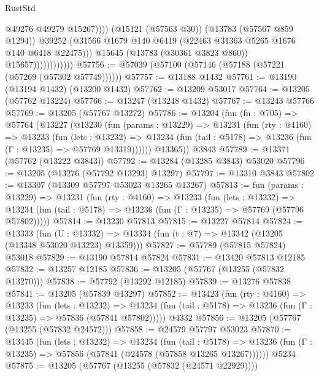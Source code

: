 \begin{lexlean}{RustStd}
\begin{coremodule}
                                      @49276
                                      @49279
                                      @15267))))
                              (@15121 (@57563 @30))
                              (@13783 (@57567 @859 @1294))
                              @39252
                              (@31566
                                @1679
                                @140
                                @6419
                                (@22463 @31363 @5265 @1676 @140 @6418 @22475)))
                            @15645
                            (@13783 (@30361 @3823 @860))
                            @15657))))))))))))
@57756 := @57039 (@57100 (@57146 (@57188 (@57221 (@57269 (@57302 @57749))))))
@57757 := @13188 @1432
@57761 := @13190 (@13194 @1432) (@13200 @1432)
@57762 := @13209 @53017
@57764 := @13205 (@57762 @13224)
@57766 := @13247 (@13248 @1432)
@57767 := @13243 @57766
@57769 := @13205 (@57767 @13272)
@57786 := @13204
    (fun (fn : @705) =>
    @57764
      (@13227
        (@13230
          (fun (params : @13229) =>
          @13231
            (fun (rty : @4160) =>
            @13233
              (fun (lets : @13232) =>
              @13234 (fun (tail : @5178) => @13236 (fun (Γ : @13235) => @57769 @13319))))))
        @13365))
    @3843
@57789 := @13371 (@57762 (@13222 @3843))
@57792 := @13284 (@13285 @3843) @53020
@57796 := @13205 (@13276 (@57792 @13293) @13297)
@57797 := @13310 @3843
@57802 := @13307 (@13309 @57797 @53023 @13265 @13267)
@57813 := fun (params : @13229) =>
  @13231
    (fun (rty : @4160) =>
    @13233
      (fun (lets : @13232) =>
      @13234 (fun (tail : @5178) => @13236 (fun (Γ : @13235) => @57769 (@57796 @57802)))))
@57814 := @13230 @57813
@57815 := @13227 @57814
@57824 := @13333
    (fun (U : @13332) => @13334 (fun (t : @7) => @13342 (@13205 (@13348 @53020 @13223) @13359)))
@57827 := @57789 (@57815 @57824) @53018
@57829 := @13190 @57814 @57824
@57831 := @13420 @57813 @12185
@57832 := @13257 @12185
@57836 := @13205 (@57767 (@13255 (@57832 @13270)))
@57838 := @57792 (@13292 @12185)
@57839 := @13276 @57838
@57841 := @13205 (@57839 @13297)
@57852 := @13423
    (fun (rty : @4160) =>
    @13233
      (fun (lets : @13232) =>
      @13234 (fun (tail : @5178) => @13236 (fun (Γ : @13235) => @57836 (@57841 @57802)))))
    @4332
@57856 := @13205 (@57767 (@13255 (@57832 @24572)))
@57858 := @24579 @57797 @53023
@57870 := @13445
    (fun (lets : @13232) =>
    @13234
      (fun (tail : @5178) =>
      @13236 (fun (Γ : @13235) => @57856 (@57841 (@24578 (@57858 @13265 @13267))))))
    @5234
@57875 := @13205 (@57767 (@13255 (@57832 (@24571 @22929))))

\end{coremodule}
\end{lexlean}
